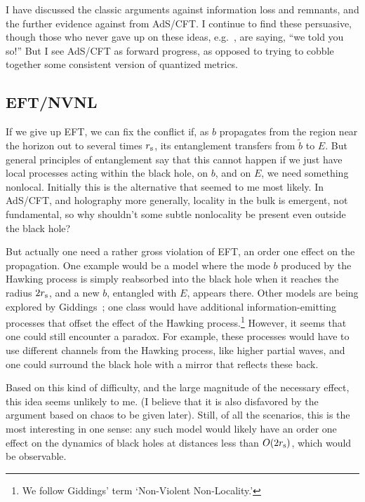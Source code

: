 \documentclass[12pt]{article}
\newcommand{\rmx}{\rm}
\newcommand{\rs}{r_{\rmx s}}
\begin{document}
I have discussed the classic arguments against information loss and remnants, and the further evidence against from \mbox{AdS/CFT}.  
I continue to find these persuasive, though those who never gave up on these ideas, e.g.~\cite{Unruh:1995gn,Chen:2014jwq}, are saying, ``we told you so!''  But I see AdS/CFT as forward progress, as opposed to trying to cobble together some consistent version of quantized metrics.

\subsection{EFT/NVNL}

If we give up EFT, we can fix the conflict if, as $b$ propagates from the region near the horizon out to several times $\rs$, its entanglement transfers from $\tilde b$ to $E$.  But general principles of entanglement say that this cannot happen if we just have local processes acting within the black hole, on $b$, and on $E$, we need something nonlocal.  Initially this is the alternative that seemed to me most likely.
In AdS/CFT, and holography more generally, locality in the bulk is emergent, not fundamental, so why shouldn't some subtle nonlocality be present even outside the black hole?

But actually one need a rather gross violation of EFT, an order one effect on the propagation.  One example would be a model where the mode $b$ produced by the Hawking process is simply reabsorbed into the black hole when it reaches the radius $2\rs$, and a new $b$, entangled with $E$, appears there.  Other models are being explored by Giddings~\cite{Giddings:2012gc}; one class would have additional information-emitting processes that offset the effect of the Hawking process.\footnote{We follow Giddings' term `Non-Violent Non-Locality.'}  However, it seems that one could still encounter a paradox.  For example, these processes would have to use different channels from the Hawking process, like higher partial waves, and one could surround the black hole with a mirror that reflects these back.  

Based on this kind of difficulty, and the large magnitude of the necessary effect, this idea seems unlikely to me.  (I believe that it is also disfavored by the argument based on chaos to be given later).  Still, of all the scenarios, this is the most interesting in one sense: any such model would likely have an order one effect on the dynamics of black holes at distances less than $O(2\rs)$, which would be observable.
\end{document}
